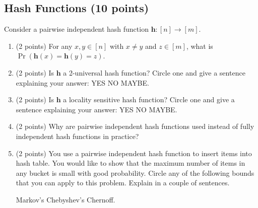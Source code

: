 \documentclass[11pt]{article}
\newcommand{\bv}[1]{\mathbf{#1}}
\newcommand{\norm}[1]{\|#1\|}
\begin{document}
\subsection*{Hash Functions \normalfont (10 points)} 
Consider a pairwise independent hash function $\bv{h}: [n] \rightarrow [m]$. 
\begin{enumerate}
\item (2 points) For any $x,y \in [n]$ with $x \neq y$ and $z \in [m]$, what is $\Pr(\bv{h}(x) = \bv{h}(y) = z)$.
\vspace{7em}
\item (2 points) Is $\bv{h}$ a 2-universal hash function? Circle one and give a sentence explaining your answer: YES\hspace{1em} NO\hspace{1em} MAYBE. 
\vspace{7em} 
\item (2 points) Is $\bv{h}$ a locality sensitive hash function? Circle one and give a sentence explaining your answer: YES\hspace{1em} NO\hspace{1em} MAYBE.  
\vspace{7em}
\item (2 points) Why are pairwise independent hash functions used instead of fully independent hash functions in practice? 
\vspace{7em}
\item (2 points) You use a pairwise independent hash function to insert items into hash table. You would like to show that the maximum number of items in any bucket is small with good probability. Circle any of the following bounds that you can apply to this problem.  Explain in a couple of sentences.
\begin{center}Markov's\hspace{1em} Chebyshev's\hspace{1em} Chernoff. \end{center}
\vspace{7em}
\end{enumerate}
\end{document}
